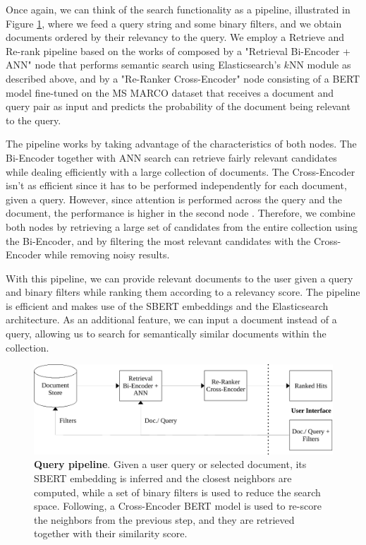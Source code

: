 \documentclass[a4paper]{article}
\begin{document}
Once again, we can think of the search functionality as a pipeline, illustrated in Figure \ref{query_pipeline}, where we feed a query string and some binary filters, and we obtain documents ordered by their relevancy to the query. We employ a Retrieve and Re-rank pipeline based on the works of \citet{nogueira2020a, kratzwald2019} composed by a "Retrieval Bi-Encoder + ANN" node that performs semantic search using Elasticsearch’s $k$NN module as described above, and by a "Re-Ranker Cross-Encoder" node consisting of a BERT model fine-tuned on the MS MARCO dataset that receives a document and query pair as input and predicts the probability of the document being relevant to the query. 

The pipeline works by taking advantage of the characteristics of both nodes. The Bi-Encoder together with ANN search can retrieve fairly relevant candidates while dealing efficiently with a large collection of documents. The Cross-Encoder isn't as efficient since it has to be performed independently for each document, given a query. However, since attention is performed across the query and the document, the performance is higher in the second node \citep{humeau2019}. Therefore, we combine both nodes by retrieving a large set of candidates from the entire collection using the Bi-Encoder, and by filtering the most relevant candidates with the Cross-Encoder while removing noisy results.

With this pipeline, we can provide relevant documents to the user given a query and binary filters while ranking them according to a relevancy score. The pipeline is efficient and makes use of the SBERT embeddings and the Elasticsearch architecture. As an additional feature, we can input a document instead of a query, allowing us to search for semantically similar documents within the collection.

\begin{figure}[H]
  \centering
  \includegraphics[scale=0.7]{./assets/query_pipeline}
  \caption{\textbf{Query pipeline}. Given a user query or selected document, its SBERT embedding is inferred and the closest neighbors are computed, while a set of binary filters is used to reduce the search space. Following, a Cross-Encoder BERT model is used to re-score the neighbors from the previous step, and they are retrieved together with their similarity score.}
  \label{query_pipeline}
\end{figure}
\end{document}
